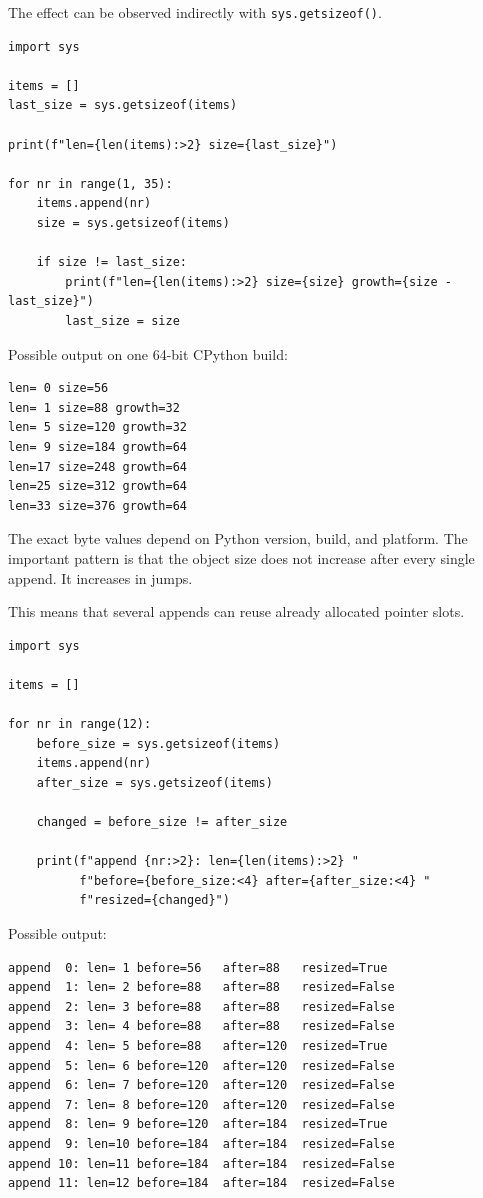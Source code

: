 The effect can be observed indirectly with \texttt{sys.getsizeof()}.

\begin{verbatim}
import sys

items = []
last_size = sys.getsizeof(items)

print(f"len={len(items):>2} size={last_size}")

for nr in range(1, 35):
    items.append(nr)
    size = sys.getsizeof(items)

    if size != last_size:
        print(f"len={len(items):>2} size={size} growth={size - last_size}")
        last_size = size
\end{verbatim}

Possible output on one 64-bit CPython build:

\begin{verbatim}
len= 0 size=56
len= 1 size=88 growth=32
len= 5 size=120 growth=32
len= 9 size=184 growth=64
len=17 size=248 growth=64
len=25 size=312 growth=64
len=33 size=376 growth=64
\end{verbatim}

The exact byte values depend on Python version, build, and platform. The important pattern is that the object size does not increase after every single append. It increases in jumps.

This means that several appends can reuse already allocated pointer slots.

\begin{verbatim}
import sys

items = []

for nr in range(12):
    before_size = sys.getsizeof(items)
    items.append(nr)
    after_size = sys.getsizeof(items)

    changed = before_size != after_size

    print(f"append {nr:>2}: len={len(items):>2} "
          f"before={before_size:<4} after={after_size:<4} "
          f"resized={changed}")
\end{verbatim}

Possible output:

\begin{verbatim}
append  0: len= 1 before=56   after=88   resized=True
append  1: len= 2 before=88   after=88   resized=False
append  2: len= 3 before=88   after=88   resized=False
append  3: len= 4 before=88   after=88   resized=False
append  4: len= 5 before=88   after=120  resized=True
append  5: len= 6 before=120  after=120  resized=False
append  6: len= 7 before=120  after=120  resized=False
append  7: len= 8 before=120  after=120  resized=False
append  8: len= 9 before=120  after=184  resized=True
append  9: len=10 before=184  after=184  resized=False
append 10: len=11 before=184  after=184  resized=False
append 11: len=12 before=184  after=184  resized=False
\end{verbatim}

